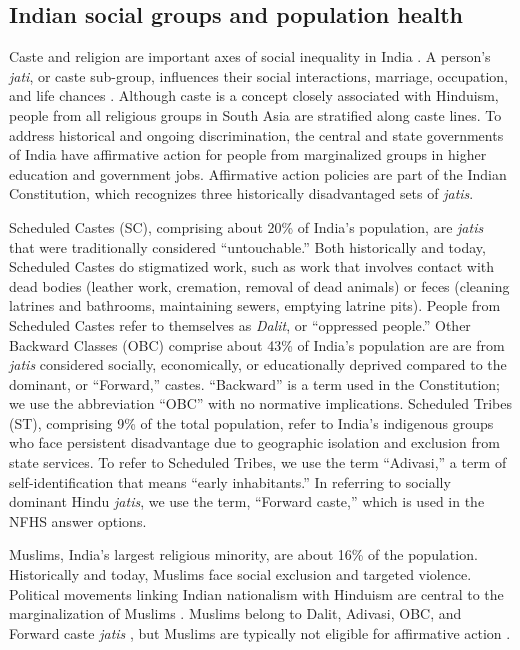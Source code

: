 \documentclass[12pt]{article}
\begin{document}
\subsection{Indian social groups and population health}

Caste and religion are important axes of social inequality in India \citep{vaid2014caste, kumar2016explaining, varshney2002ethnic, majid2015indian}. A person's \textit{jati}, or caste sub-group, influences their social interactions, marriage, occupation, and life chances \citep{deshpande2011grammar, thorat2012blocked}. Although caste is a concept closely associated with Hinduism, people from all religious groups in South Asia are stratified along caste lines. To address historical and ongoing discrimination, the central and state governments of India have affirmative action for people from marginalized groups in higher education and government jobs. Affirmative action policies are part of the Indian Constitution, which recognizes three historically disadvantaged sets of \textit{jatis}. 

Scheduled Castes (SC), comprising about 20\% of India's population, are \textit{jatis} that were traditionally considered ``untouchable.''  Both historically and today, Scheduled Castes do stigmatized work, such as work that involves contact with dead bodies (leather work, cremation, removal of dead animals) or feces (cleaning latrines and bathrooms, maintaining sewers, emptying latrine pits).  People from Scheduled Castes refer to themselves as \textit{Dalit}, or ``oppressed people.''  Other Backward Classes (OBC) comprise about 43\% of India's population are are from \textit{jatis} considered socially, economically, or educationally deprived compared to the dominant, or ``Forward,'' castes.  ``Backward'' is a term used in the Constitution; we use the abbreviation ``OBC'' with no normative implications. Scheduled Tribes (ST), comprising 9\% of the total population, refer to India’s indigenous groups who face persistent disadvantage due to geographic isolation and exclusion from state services.  To refer to Scheduled Tribes, we use the term ``Adivasi,'' a term of self-identification that means ``early inhabitants.''  In referring to socially dominant Hindu \textit{jatis}, we use the term, ``Forward caste,'' which is used in the NFHS answer options.

Muslims, India's largest religious minority, are about 16\% of the population.  Historically and today, Muslims face social exclusion and targeted violence.  Political movements linking Indian nationalism with Hinduism are central to the marginalization of Muslims \citep{farooqui2020political}. Muslims belong to Dalit, Adivasi, OBC, and Forward caste \emph{jatis} \citep{ahmad2007recognition}, but Muslims are typically not eligible for affirmative action \citep{hasan2018muslims, hasan2022wider}.     
\end{document}

